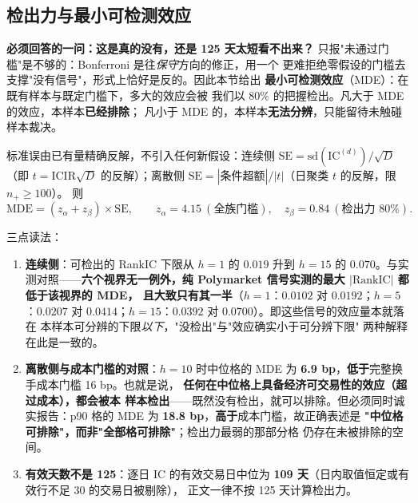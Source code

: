 \documentclass[11pt, a4paper]{ctexart}
\newcommand{\code}[1]{\texttt{\small #1}}
\begin{document}
\subsection{检出力与最小可检测效应}\label{sec:mde}

\textbf{必须回答的一问：这是真的没有，还是 125 天太短看不出来？}
只报"未通过门槛"是不够的：Bonferroni 是往\emph{保守}方向的修正，用一个
更难拒绝零假设的门槛去支撑"没有信号"，形式上恰好是反的。因此本节给出
\textbf{最小可检测效应}（MDE）：在既有样本与既定门槛下，多大的效应会被
我们以 80\% 的把握检出。凡大于 MDE 的效应，本样本\textbf{已经排除}；
凡小于 MDE 的，本样本\textbf{无法分辨}，只能留待未触碰样本裁决。

标准误由已有量精确反解，不引入任何新假设：连续侧
$\mathrm{SE}=\mathrm{sd}(\mathrm{IC}^{(d)})/\sqrt{D}$（即
$t=\mathrm{ICIR}\sqrt{D}$ 的反解）；离散侧
$\mathrm{SE}=|\text{条件超额}|/|t|$（日聚类 $t$ 的反解，限 $n_{+}\ge100$）。
则
\[
\mathrm{MDE} = (z_\alpha + z_\beta)\times \mathrm{SE},
\qquad z_\alpha = 4.15\ (\text{全族门槛}),\quad
z_\beta = 0.84\ (\text{检出力 }80\%).
\]

\begin{table}[h!]\centering\small
\caption{最小可检测效应（各格取中位数；离散侧另给 p90 以示分布。
数据由 \code{make\_concise\_table.py} 从 \code{signal\_grid.parquet} 计算）}
\label{tab:mde}

\end{table}

\noindent 三点读法：

\begin{enumerate}
\item \textbf{连续侧}：可检出的 RankIC 下限从 $h=1$ 的 $0.019$ 升到
  $h=15$ 的 $0.070$。与实测对照——\textbf{六个视界无一例外，纯
  Polymarket 信号实测的最大 $|\mathrm{RankIC}|$ 都低于该视界的 MDE，
  且大致只有其一半}（$h=1$：$0.0102$ 对 $0.0192$；$h=5$：$0.0207$ 对
  $0.0414$；$h=15$：$0.0392$ 对 $0.0700$）。即这些信号的效应量本就落在
  本样本可分辨的下限\emph{以下}，"没检出"与"效应确实小于可分辨下限"
  两种解释在此是一致的。
\item \textbf{离散侧与成本门槛的对照}：$h=10$ 时中位格的 MDE 为
  \textbf{6.9 bp}，\textbf{低于}完整换手成本门槛 16 bp。也就是说，
  \textbf{任何在中位格上具备经济可交易性的效应（超过成本），都会被本
  样本检出}——既然没有检出，就可以排除。但必须同时诚实报告：p90 格的
  MDE 为 \textbf{18.8 bp}，\textbf{高于}成本门槛，故正确表述是
  \textbf{"中位格可排除"，而非"全部格可排除"}；检出力最弱的那部分格
  仍存在未被排除的空间。
\item \textbf{有效天数不是 125}：逐日 IC 的有效交易日中位为
  \textbf{109 天}（日内取值恒定或有效行不足 30 的交易日被剔除），
  正文一律不按 125 天计算检出力。
\end{enumerate}
\end{document}
